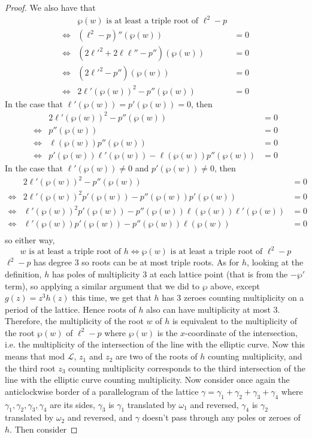 \documentclass[10pt,a4paper]{amsart}
\begin{document}
\begin{proof}
We also have that
\begin{align*}
    &\text{$\wp(w)$ is at least a triple root of $\ell^2-p$}\\
    \iff &(\ell^2-p)''(\wp(w))&=0\\
    \iff &(2{\ell'}^2+2\ell\ell''-p'')(\wp(w))&=0\\
    \iff &(2{\ell'}^2-p'')(\wp(w))&=0\\
    \iff&2\ell'(\wp(w))^2-p''(\wp(w))&=0
\end{align*}
In the case that $\ell'(\wp(w))=p'(\wp(w))=0$, then 
\begin{align*}
&2\ell'(\wp(w))^2-p''(\wp(w))&=0\\
\iff&p''(\wp(w))&=0\\
\iff&\ell(\wp(w))p''(\wp(w))&=0\\
\iff&p'(\wp(w))\ell'(\wp(w))-\ell(\wp(w))p''(\wp(w))&=0
\end{align*}
In the case that $\ell'(\wp(w))\neq0$ and $p'(\wp(w))\neq0$, then
\begin{align*}
&2\ell'(\wp(w))^2-p''(\wp(w))&=0\\
\iff&2\ell'(\wp(w))^2p'(\wp(w))-p''(\wp(w))p'(\wp(w))&=0\\
\iff&\ell'(\wp(w))^2p'(\wp(w))-p''(\wp(w))\ell(\wp(w))\ell'(\wp(w))&=0\\
\iff&\ell'(\wp(w))p'(\wp(w))-p''(\wp(w))\ell(\wp(w))&=0\\
\end{align*}
so either way, 
$$w\text{ is at least a triple root of }h \iff \wp(w)\text{ is at least a triple root of }\ell^2-p$$
$\ell^2-p$ has degree $3$ so roots can be at most triple roots. As for $h$, looking at the definition, $h$ has poles of multiplicity $3$ at each lattice point (that is from the $-\wp'$ term), so applying a similar argument that we did to $\wp$ above, except $g(z)=z^3h(z)$ this time, we get that $h$ has $3$ zeroes counting multiplicity on a period of the lattice. Hence roots of $h$ also can have multiplicity at most $3$. Therefore,  the multiplicity of the root $w$ of $h$ is equivalent to the multiplicity of the root $\wp(w)$ of $\ell^2-p$ where $\wp(w)$ is the $x$-coordinate of the intersection, i.e. the multiplicity of the intersection of the line with the elliptic curve.
\newline\newline
Now this means that mod $\mathcal L$, $z_1$ and $z_2$ are two of the roots of $h$ counting multiplicity, and the third root $z_3$ counting multiplicity corresponds to the third intersection of the line with the elliptic curve counting multiplicity. Now consider once again the anticlockwise border of a parallelogram of the lattice $\gamma=\gamma_1+\gamma_2+\gamma_3+\gamma_4$ where $\gamma_1,\gamma_2,\gamma_3,\gamma_4$ are its sides, $\gamma_3$ is $\gamma_1$ translated by $\omega_1$ and reversed, $\gamma_4$ is $\gamma_2$ translated by $\omega_2$ and reversed, and $\gamma$ doesn't pass through any poles or zeroes of $h$. Then consider

\end{proof}
\end{document}
